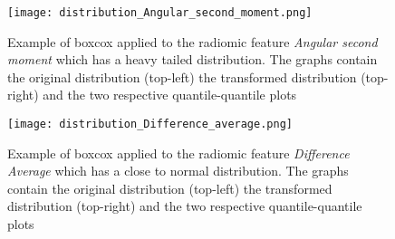 \begin{figure}[htbp]
  		\texttt{[image: distribution\_Angular\_second\_moment.png]}
        \caption{Example of boxcox applied to the radiomic feature \textit{Angular second moment} which has a heavy tailed distribution. The graphs contain the original distribution (top-left) the transformed distribution (top-right) and the two respective quantile-quantile plots \label{fig:boxcox_example}}
\end{figure}

\begin{figure}[htbp]
  		\texttt{[image: distribution\_Difference\_average.png]}
        \caption{Example of boxcox applied to the radiomic feature \textit{Difference Average} which has a close to normal distribution. The graphs contain the original distribution (top-left) the transformed distribution (top-right) and the two respective quantile-quantile plots \label{fig:boxcox_example_normal}}
\end{figure}

